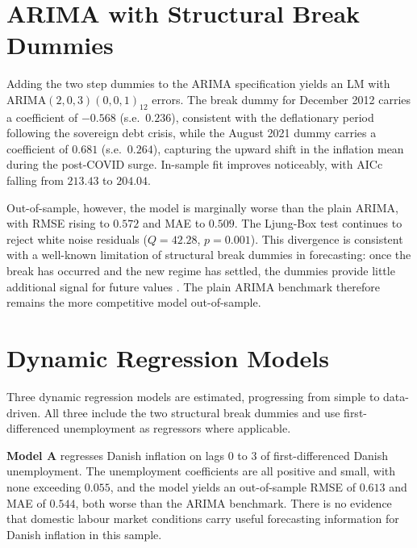 \section{ARIMA with Structural Break Dummies}

Adding the two step dummies to the ARIMA specification yields an LM with 
ARIMA$(2,0,3)(0,0,1)_{12}$ errors. The break dummy for December 2012 carries 
a coefficient of $-0.568$ (s.e.\ $0.236$), consistent with the deflationary 
period following the sovereign debt crisis, while the August 2021 dummy 
carries a coefficient of $0.681$ (s.e.\ $0.264$), capturing the upward shift 
in the inflation mean during the post-COVID surge. In-sample fit improves 
noticeably, with AICc falling from $213.43$ to $204.04$.

Out-of-sample, however, the model is marginally worse than the plain ARIMA, 
with RMSE rising to $0.572$ and MAE to $0.509$. The Ljung-Box test continues 
to reject white noise residuals ($Q = 42.28$, $p = 0.001$). This divergence 
is consistent with a well-known limitation of structural break dummies in 
forecasting: once the break has occurred and the new regime has settled, the 
dummies provide little additional signal for future values 
\parencite{clements2002}. The plain ARIMA benchmark therefore remains the 
more competitive model out-of-sample.


\section{Dynamic Regression Models}

Three dynamic regression models are estimated, progressing from simple to 
data-driven. All three include the two structural break dummies and use 
first-differenced unemployment as regressors where applicable.

\textbf{Model A} regresses Danish inflation on lags 0 to 3 of first-differenced 
Danish unemployment. The unemployment coefficients are all positive and small, 
with none exceeding $0.055$, and the model yields an out-of-sample RMSE of 
$0.613$ and MAE of $0.544$, both worse than the ARIMA benchmark. There is no 
evidence that domestic labour market conditions carry useful forecasting 
information for Danish inflation in this sample.

